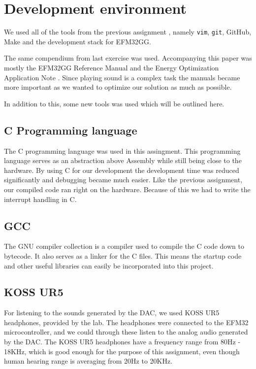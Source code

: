 \section{Development environment}
We used all of the tools from the previous assignment \cite{report-1}, namely \texttt{vim}, \texttt{git}, GitHub, Make and the development stack for EFM32GG.

The same compendium \cite{eeds-compendium} from last exercise was used.
Accompanying this paper was mostly the EFM32GG Reference Manual \cite{efm32gg-ref-man} and the Energy Optimization Application Note \cite{efm32gg-energy-op}.
Since playing sound is a complex task the manuals became more important as we wanted to optimize our solution as much as possible.

In addition to this, some new tools was used which will be outlined here.

\subsection{C Programming language}
The C programming language was used in this assingment.
This programming language serves as an abstraction above Assembly while still being close to the hardware.
By using C for our development the development time was reduced significantly and debugging became much easier.
Like the previous assignment, our compiled code ran right on the hardware.
Because of this we had to write the interrupt handling in C.

\subsection{GCC}
The GNU compiler collection is a compiler used to compile the C code down to bytecode.
It also serves as a linker for the C files. This means the startup code and other useful libraries can easily be incorporated into this project.

\subsection{KOSS UR5}
For listening to the sounds generated by the DAC, we used KOSS UR5 headphones, provided by the lab.
The headphones were connected to the EFM32 microcontroller, and we could through these listen to the analog audio generated by the DAC.
The KOSS UR5 headphones have a frequency range from 80Hz - 18KHz, which is good enough for the purpose of this assignment, even though human hearing range is averaging from 20Hz to 20KHz.
